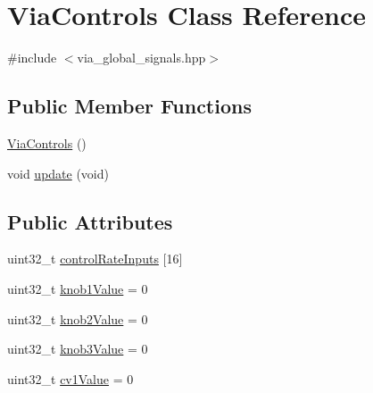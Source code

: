 \hypertarget{class_via_controls}{}\section{Via\+Controls Class Reference}
\label{class_via_controls}


{\ttfamily \#include $<$via\+\_\+global\+\_\+signals.\+hpp$>$}

\subsection*{Public Member Functions}
\begin{DoxyCompactItemize}
\item 
\mbox{\hyperlink{class_via_controls_a4aabf655d70aee7d8f2b7089182eeea8}{Via\+Controls}} ()
\item 
void \mbox{\hyperlink{class_via_controls_a49ffb416e7453065a788408886977910}{update}} (void)
\end{DoxyCompactItemize}
\subsection*{Public Attributes}
\begin{DoxyCompactItemize}
\item 
uint32\+\_\+t \mbox{\hyperlink{class_via_controls_afc5576a70aa1658819755c0000a169b8}{control\+Rate\+Inputs}} \mbox{[}16\mbox{]}
\item 
uint32\+\_\+t \mbox{\hyperlink{class_via_controls_a2c27605bfe637378aba052214a6a6e38}{knob1\+Value}} = 0
\item 
uint32\+\_\+t \mbox{\hyperlink{class_via_controls_a852277409401fd709e08bdf575536229}{knob2\+Value}} = 0
\item 
uint32\+\_\+t \mbox{\hyperlink{class_via_controls_ac721e5fd2a1dfae09a4ae9e8377698cd}{knob3\+Value}} = 0
\item 
uint32\+\_\+t \mbox{\hyperlink{class_via_controls_a83d038f83ce913200cb374d45bbe2e7d}{cv1\+Value}} = 0
\end{DoxyCompactItemize}
